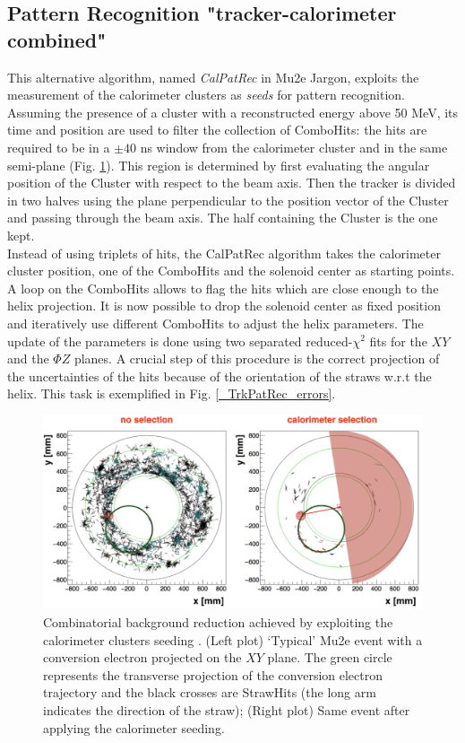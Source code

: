 \documentclass[12pt,a4paper,openright, oneside, titlepage]{book} %
\begin{document}
\subsection{Pattern Recognition "tracker-calorimeter combined"}
This alternative algorithm, named \textit{CalPatRec} in Mu2e Jargon, 
exploits the measurement of the calorimeter clusters as \textit{seeds} for pattern recognition. 
Assuming the presence of a cluster with a reconstructed energy above 50 MeV, 
its time and position are used to filter the collection of ComboHits: 
the hits are required to be in a $\pm 40$ ns window from the calorimeter cluster 
and in the same semi-plane (Fig. \ref{_CalPatRec_semiplane}). 
This region is determined by first evaluating the angular position of the Cluster with respect to the beam axis. Then the tracker is divided in two halves using the plane perpendicular to the position vector of the Cluster and passing through the beam axis. The half containing the Cluster is the one kept.\\
Instead of using triplets of hits, the CalPatRec algorithm takes the calorimeter cluster position, one of the ComboHits and the solenoid center as starting points.
A loop on the ComboHits allows to flag the hits which are close enough to the helix projection. 
It is now possible to drop the solenoid center as fixed position and iteratively use different ComboHits to adjust the helix parameters.
The update of the parameters is done using two separated reduced-$\chi^2$ fits for the $XY$ and the $\Phi Z$ planes. 
A crucial step of this procedure is the correct projection of the uncertainties of the hits because of the orientation of the straws w.r.t the helix. This task is exemplified in Fig. \ref{_TrkPatRec_errors}.

\begin{figure}[h!]
\centering
\includegraphics[scale=0.6]{giani_CalPatRec_semiplane}
\caption[Calorimeter seeded reconstruction]{Combinatorial background reduction achieved by exploiting the calorimeter clusters seeding \cite{GianiPatRec:2020}. 
(Left plot)  `Typical' Mu2e event with a conversion electron projected on the $XY$ plane. 
The green circle represents the transverse projection of the conversion electron trajectory 
and the black crosses are StrawHits (the long arm indicates the direction of the straw); 
(Right plot) Same event after applying the calorimeter seeding.}
\label{_CalPatRec_semiplane}
\end{figure}
\end{document}
